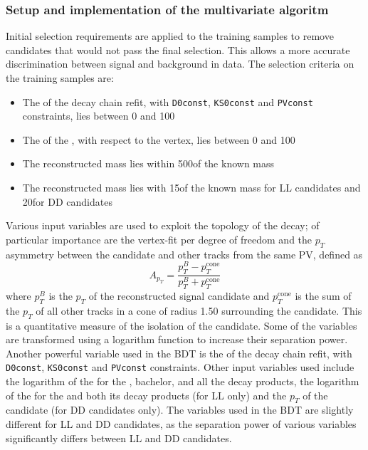 \subsubsection{Setup and implementation of the multivariate algoritm}

Initial selection requirements are applied to the training samples to remove candidates that would not pass the final selection. This allows a more accurate discrimination between signal and background in data. The selection criteria on the training samples are:

\begin{itemize}
\item The \chisq of the decay chain refit, with {\tt D0const}, {\tt KS0const} and {\tt PVconst} constraints, lies between 0 and 100
\item The \chisqip of the \B, with respect to the \B vertex, lies between 0 and 100
\item The reconstructed \Kstarpm mass lies within 500\mev of the known \Kstar mass
\item The reconstructed \KS mass lies with 15\mev of the known \KS mass for LL candidates and 20\mev for DD candidates
\end{itemize}

Various input variables are used to exploit the topology of the decay; of particular importance are the \Bm vertex-fit \chisq per degree of freedom and the $p_T$ asymmetry between the \Bm candidate and other tracks from the same PV, defined as
\begin{equation}
A_{p_T} = \frac{p_T^B - p_T^{\text{cone}}}{p_T^B + p_T^{\text{cone}}}
\end{equation}
where $p_T^B$ is the $p_T$ of the reconstructed \Bm signal candidate and $p_T^{\text{cone}}$ is the sum of the $p_T$ of all other tracks in a cone of radius 1.50 surrounding the \Bm candidate. This is a quantitative measure of the isolation of the \Bm candidate. Some of the variables are transformed using a logarithm function to increase their separation power. Another powerful variable used in the BDT is the \chisq of the decay chain refit, with {\tt D0const}, {\tt KS0const} and {\tt PVconst} constraints. Other input variables used include the logarithm of the \chisqip for the \B, bachelor, \D and all the \D decay products, the logarithm of the \chisqip for the \KS and both its decay products (for LL only) and the $p_T$ of the \KS candidate (for DD candidates only). The variables used in the BDT are slightly different for LL and DD candidates, as the separation power of various \KS variables significantly differs between LL and DD candidates. 

